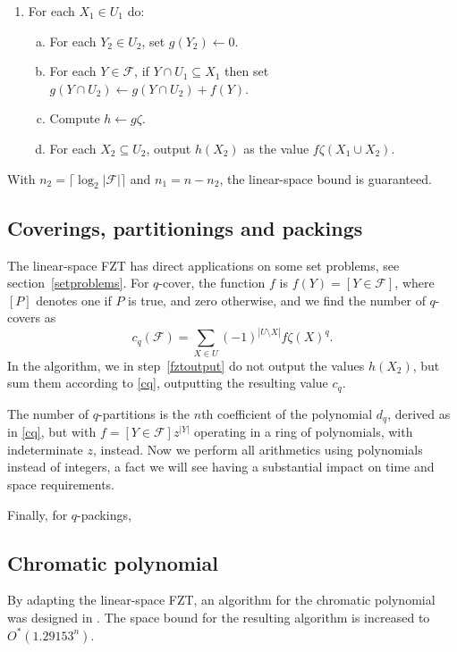 \documentclass{cslthse-msc}
\begin{document}
\begin{enumerate}[1.]
 \item For each $X_1 \in U_1$ do:
 \begin{enumerate}[a)]
  \item For each $Y_2 \in U_2$, set $g(Y_2) \leftarrow 0$.
  \item For each $Y \in \mathcal{F}$, if $Y \cap U_1 \subseteq X_1$ then set $g(Y \cap U_2) \leftarrow g(Y \cap U_2) + f(Y)$.
  \item Compute $h \leftarrow g\zeta$.
  \item For each $X_2 \subseteq U_2$, output $h(X_2)$ as the value $f\zeta(X_1 \cup X_2)$. \label{fztoutput}
 \end{enumerate}
\end{enumerate}
With $n_2 = \lceil \log_2|\mathcal{F}| \rceil$ and $n_1 = n - n_2$, the linear-space bound is guaranteed.

\subsection{Coverings, partitionings and packings}
The linear-space FZT has direct applications on some set problems, see section~\ref{setproblems}. For $q$-cover, the function $f$ is $f(Y) = [ Y \in \mathcal{F} ]$, where $[P]$ denotes one if $P$ is true, and zero otherwise, and we find the number of $q$-covers as 
\begin{equation} \label{cq}
c_q(\mathcal{F}) = \sum_{X \in U} (-1)^{|U \setminus X|} f\zeta(X)^q.
\end{equation}
In the algorithm, we in step~\ref{fztoutput} do not output the values $h(X_2)$, but sum them according to \ref{cq}, outputting the resulting value $c_q$.

The number of $q$-partitions is the $n$th coefficient of the polynomial $d_q$, derived as in \ref{cq}, but with $f = [Y \in \mathcal{F}]z^{|Y|}$ operating in a ring of polynomials, with indeterminate $z$, instead. Now we perform all arithmetics using polynomials instead of integers, a fact we will see having a substantial impact on time and space requirements.

Finally, for $q$-packings, 



\subsection{Chromatic polynomial}\label{bhkk}
By adapting the linear-space FZT, an algorithm for the chromatic polynomial was designed in \cite{cov_pack}. The space bound for the resulting algorithm is increased to $O^*(1.29153^n)$.
\end{document}
